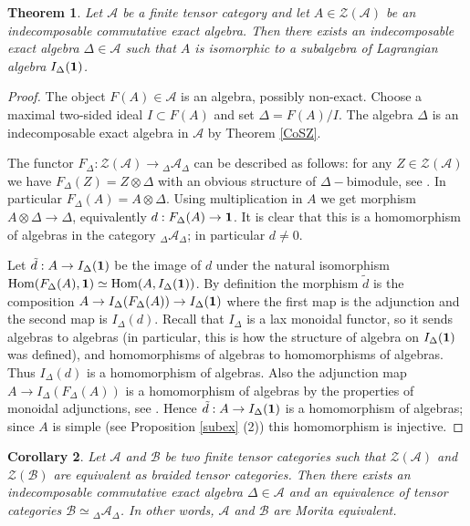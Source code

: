 \documentclass{amsart}
\newtheorem{theorem}{Theorem}[section]
\newtheorem{corollary}[theorem]{Corollary}
\theoremstyle{definition}
\newcommand{\cZ}{\mathcal{Z}}
\newcommand{\A}{\mathcal{A}}
\newcommand{\B}{\mathcal{B}}
\newcommand{\Hom}{\mathrm{Hom}}
\newcommand{\be}{{\bf 1}}
\numberwithin{equation}{section}
\begin{document}
\begin{theorem}\label{lagr}
    Let $\A$ be a finite tensor category and let $A\in \cZ(\A)$ be an indecomposable
    commutative exact algebra. Then there exists an indecomposable exact algebra 
    $\Delta \in \A$ such that $A$ is isomorphic to a subalgebra of Lagrangian algebra
    $I_\Delta(\be)$.
\end{theorem}

\begin{proof}
    The object $F(A)\in \A$ is an algebra, possibly non-exact. Choose a maximal two-sided
    ideal $I\subset F(A)$ and set $\Delta =F(A)/I$. The algebra $\Delta$ is an indecomposable
    exact algebra in $\A$ by Theorem \ref{CoSZ}. 

    The functor $F_\Delta :\cZ(\A)\to \phantom{}_\Delta \A_\Delta$ can be described as
    follows: for any $Z\in \cZ(\A)$ we have $F_\Delta(Z)=Z\otimes \Delta$ with an obvious structure of $\Delta-$bimodule, see \cite[Remark 7.16.3]{EGNO}. In particular $F_\Delta(A)=A\otimes \Delta$. Using multiplication in $A$ we get morphism $A\otimes \Delta \to \Delta$, equivalently $d: F_\Delta(A)\to \be$. 
    It is clear that this is a homomorphism of algebras in 
    the category $\phantom{}_\Delta \A_\Delta$; in particular $d\ne 0$.

    Let $\tilde d: A\to I_\Delta(\be)$ be the image of $d$ under
    the natural isomorphism $\Hom(F_\Delta(A),\be)\simeq \Hom(A,I_\Delta(\be))$. By definition the morphism $\tilde d$
    is the composition $A\to I_\Delta(F_\Delta(A))\to I_\Delta(\be)$
    where the first map is the adjunction and the second map is $I_\Delta(d)$. Recall that $I_\Delta$ is a lax monoidal functor,
    so it sends algebras to algebras (in particular, this is how the
    structure of algebra on $I_\Delta(\be)$ was defined), and homomorphisms of algebras
    to homomorphisms of algebras. Thus $I_\Delta(d)$ is a homomorphism 
    of algebras. Also the adjunction map $A\to I_\Delta(F_\Delta(A))$
    is a homomorphism of algebras by the properties of monoidal adjunctions, see \cite[Proposition 2.1]{cafe}. Hence $\tilde d: A\to I_\Delta(\be)$
    is a homomorphism of algebras; since $A$ is simple (see Proposition \ref{subex} (2)) this homomorphism is injective.
\end{proof}

\begin{corollary}\label{8.12.3}
    Let $\A$ and $\B$ be two finite tensor categories such that $\cZ(\A)$ and 
    $\cZ(\B)$ are equivalent as braided tensor categories. Then there exists
    an indecomposable commutative exact algebra $\Delta \in \A$ and an equivalence
    of tensor categories $\B \simeq \phantom{}_\Delta \A_\Delta$. In other words,
    $\A$ and $\B$ are Morita equivalent.
\end{corollary}
\end{document}
